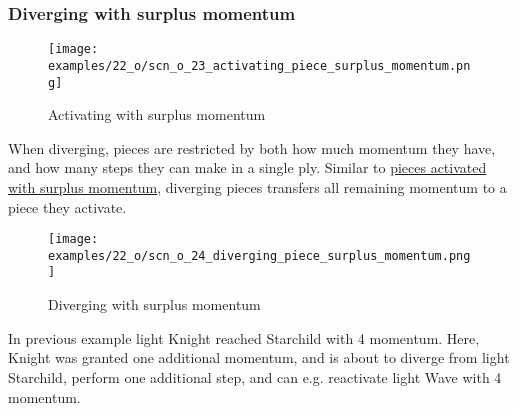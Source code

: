 \vspace*{0.9\baselineskip}
\subsubsection*{Diverging with surplus momentum}
\label{sec:One/Starchild/Divergence/Diverging with surplus momentum}

\vspace*{-0.9\baselineskip}
\noindent
\begin{wrapfigure}[9]{l}{0.4\textwidth}
\centering
\texttt{[image: examples/22\_o/scn\_o\_23\_activating\_piece\_surplus\_momentum.png]}
\vspace*{-0.4\baselineskip}
\caption{Activating with surplus momentum}
\label{fig:scn_o_23_activating_piece_surplus_momentum}
\end{wrapfigure}
When diverging, pieces are restricted by both how much momentum they have, and how
many steps they can make in a single ply. \newline
\indent
Similar to
\hyperref[fig:scn_mv_32_single_step_piece_momentum]{pieces activated with surplus momentum},
diverging pieces transfers all remaining momentum to a piece they activate.

\hspace*{\fill} %

\noindent
\begin{wrapfigure}[8]{l}{0.4\textwidth}
\centering
\texttt{[image: examples/22\_o/scn\_o\_24\_diverging\_piece\_surplus\_momentum.png]}
\vspace*{-0.4\baselineskip}
\caption{Diverging with surplus momentum}
\label{fig:scn_o_24_diverging_piece_surplus_momentum}
\end{wrapfigure}
In previous example light Knight reached Starchild with 4 momentum. Here, Knight
was granted one additional momentum, and is about to diverge from light Starchild,
perform one additional step, and can e.g. reactivate light Wave with 4 momentum.

